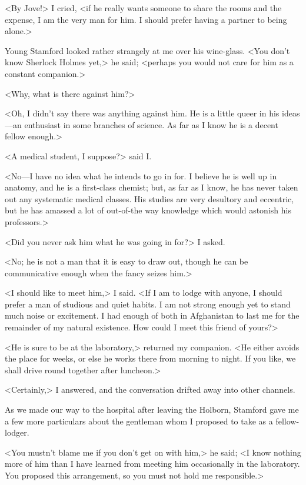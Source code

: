 <By Jove!> I cried, <if he really wants someone to share the rooms and the expense, I am the very man for him. I should prefer having a partner to being alone.>

Young Stamford looked rather strangely at me over his wine-glass. <You don't know Sherlock Holmes yet,> he said; <perhaps you would not care for him as a constant companion.>

<Why, what is there against him?>

<Oh, I didn't say there was anything against him. He is a little queer in his ideas—an enthusiast in some branches of science. As far as I know he is a decent fellow enough.>

<A medical student, I suppose?> said I\@.

<No—I have no idea what he intends to go in for. I believe he is well up in anatomy, and he is a first-class chemist; but, as far as I know, he has never taken out any systematic medical classes. His studies are very desultory and eccentric, but he has amassed a lot of out-of-the way knowledge which would astonish his professors.>

<Did you never ask him what he was going in for?> I asked.

<No; he is not a man that it is easy to draw out, though he can be communicative enough when the fancy seizes him.>

<I should like to meet him,> I said. <If I am to lodge with anyone, I should prefer a man of studious and quiet habits. I am not strong enough yet to stand much noise or excitement. I had enough of both in Afghanistan to last me for the remainder of my natural existence. How could I meet this friend of yours?>

<He is sure to be at the laboratory,> returned my companion. <He either avoids the place for weeks, or else he works there from morning to night. If you like, we shall drive round together after luncheon.>

<Certainly,> I answered, and the conversation drifted away into other channels.

As we made our way to the hospital after leaving the Holborn, Stamford gave me a few more particulars about the gentleman whom I proposed to take as a fellow-lodger.

<You mustn't blame me if you don't get on with him,> he said; <I know nothing more of him than I have learned from meeting him occasionally in the laboratory. You proposed this arrangement, so you must not hold me responsible.>

